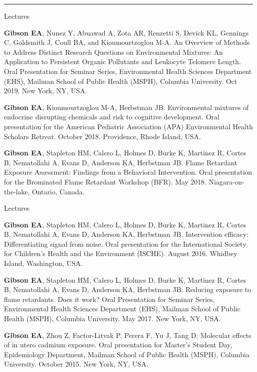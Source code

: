 \documentclass[a4paper,10pt]{article}
\newlength{\cvcolumngapwidth}
\newlength{\cvleftcolumnwidth}
\newlength{\cvrightcolumnwidth}
\newcommand{\cvsectionstyle}[1]{{\normalsize\cvsectionfont\textcolor{cvsectioncolor}{#1}}}
\newcommand{\cvdurationstyle}[1]{{\small\cvdurationfont\textcolor{cvdurationcolor}{#1}}}
\newlength{\cvafteritemskipamount}
\newlength{\cvaftersectionskipamount}
\newlength{\cvparskip}
\newcommand{\cvsection}[1]{
    \begin{minipage}[t]{\cvleftcolumnwidth}
        \raggedleft\cvsectionstyle{#1}
    \end{minipage}%
    \hspace{\cvcolumngapwidth}%
    \begin{minipage}[t]{\cvrightcolumnwidth}
        \textcolor{cvrulecolor}{\rule{\cvrightcolumnwidth}{0.3mm}}
    \end{minipage}

    \vspace{\cvaftersectionskipamount}
}
\newcommand{\cvitem}[2]{
    \begin{minipage}[t]{\cvleftcolumnwidth}
        \raggedleft #1
    \end{minipage}%
    \hspace{\cvcolumngapwidth}%
    \begin{minipage}[t]{\cvrightcolumnwidth}
        \setlength{\parskip}{\cvparskip} #2
    \end{minipage}

    \vspace{\cvafteritemskipamount}
}
\begin{document}
\cvsection{PRESENTATIONS}
\cvitem{
    \cvdurationstyle{Lectures}
}{  
    \begin{etaremune}
     \setcounter{enumi}{7}
     	\item \textbf{Gibson EA}, Nunez Y, Abuawad A, Zota AR, Renzetti S, Devick KL, Gennings C, Goldsmith J, Coull BA, and Kioumourtzoglou M-A. An Overview of Methods to Address Distinct Research Questions on Environmental Mixtures: An Application to Persistent Organic Pollutants and Leukocyte Telomere Length. Oral Presentation for Seminar Series, Environmental Health Sciences Department (EHS), Mailman School of Public Health (MSPH), Columbia University. Oct 2019. New York, NY, USA.
	\item \textbf{Gibson EA}, Kioumourtzoglou M-A, Herbstman JB. Environmental mixtures of endocrine disrupting chemicals and risk to cognitive development. Oral presentation for the American Pediatric Association (APA) Environmental Health Scholars Retreat. October 2018. Providence, Rhode Island, USA.
	\item \textbf{Gibson EA}, Stapleton HM, Calero L, Holmes D, Burke K, Martinez R, Cortes B, Nematollahi A, Evans D, Anderson KA, Herbstman JB. Flame Retardant Exposure Assessment: Findings from a Behavioral Intervention. Oral presentation for the Brominated Flame Retardant Workshop (BFR). May 2018. Niagara-on-the-lake, Ontario, Canada. 
\end{etaremune}
}

\cvitem{
    \cvdurationstyle{Lectures}
}{  
    \begin{etaremune}
    	\item \textbf{Gibson EA}, Stapleton HM, Calero L, Holmes D, Burke K, Martinez R, Cortes B, Nematollahi A, Evans D, Anderson KA, Herbstman JB. Intervention efficacy: Differentiating signal from noise. Oral presentation for the International Society for Children’s Health and the Environment (ISCHE). August 2016. Whidbey Island, Washington, USA.
	\item \textbf{Gibson EA}, Stapleton HM, Calero L, Holmes D, Burke K, Martinez R, Cortes B, Nematollahi A, Evans D, Anderson KA, Herbstman JB. Reducing exposure to flame retardants. Does it work? Oral Presentation for Seminar Series, Environmental Health Sciences Department (EHS), Mailman School of Public Health (MSPH), Columbia University. May 2017. New York, NY, USA.
	\item \textbf{Gibson EA}, Zhou Z, Factor-Litvak P, Perera F, Yu J, Tang D. Molecular effects of in utero cadmium exposure. Oral presentation for Master’s Student Day, Epidemiology Department, Mailman School of Public Health (MSPH), Columbia University. October 2015. New York, NY, USA.  
\end{etaremune}
}
\end{document}
